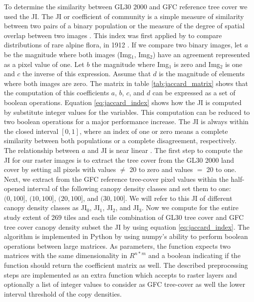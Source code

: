 			To determine the similarity between \ac{GL30} 2000 and \ac{GFC} reference tree cover we used the \ac{JI}. The \ac{JI} or coefficient of community is a simple measure of similarity between two pairs of a binary population or the measure of the degree of spatial overlap between two images \citep{Sampat2009}. This index was first applied by \citeauthor{Jaccard1912} to compare distributions of rare alpine flora, in 1912 \citep{Jaccard1912}. If we compare two binary images, let $a$ be the magnitude where both images (Img$_1$, Img$_2$) have an agreement represented as a pixel value of one. Let $b$ the magnitude where Img$_1$ is zero and Img$_2$ is one and $c$ the inverse of this expression. Assume that $d$ is the magnitude of elements where both images are zero. The matrix in table \ref{tab:jaccard_matrix} shows that the computation of this coefficients $a$, $b$, $c$, and $d$ can be expressed as a set of boolean operations. Equation \ref{eq:jaccard_index} shows how the \ac{JI} is computed by substitute integer values for the variables. This computation can be reduced to two boolean operations for a major performance increase. The \ac{JI} is always within the closed interval $[0,1]$, where an index of one or zero means a complete similarity between both populations or a complete disagreement, respectively. The relationship between $a$ and \ac{JI} is near linear \citep{Shi1993}. The first step to compute the \ac{JI} for our raster images is to extract the tree cover from the \ac{GL30} 2000 land cover by setting all pixels with values $\neq$ 20 to zero and values $=$ 20 to one. Next, we extract from the \ac{GFC} reference tree-cover pixel values within the half-opened interval of the following canopy density classes and set them to one: $(0,100]$, $(10,100]$, $(20,100]$, and $(30,100]$. We will refer to this \ac{JI} of different canopy density classes as JI$_0$, JI$_1$, JI$_2$, and JI$_3$. Now we compute for the entire study extent of 269 tiles and each tile combination of \ac{GL30} tree cover and \ac{GFC} tree cover canopy density subset the \ac{JI} by using equation \ref{eq:jaccard_index}. The algorithm is implemented in Python by using numpy's ability to perform boolean operations between large matrices. As parameters, the function expects two matrices with the same dimensionality in $R^{n*m}$ and a boolean indicating if the function should return the coefficient matrix as well. The described preprocessing steps are implemented as an extra function which accepts to raster layers and optionally a list of integer values to consider as \ac{GFC} tree-cover as well the lower interval threshold of the copy densities.
